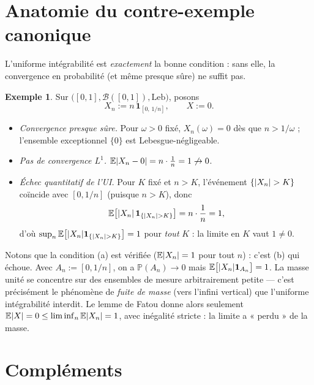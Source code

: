 \documentclass[11pt,a4paper]{article}
\theoremstyle{definition}
\newtheorem{example}[theorem]{Exemple}
\theoremstyle{remark}
\newcommand{\E}{\mathbb{E}}
\newcommand{\PP}{\mathbb{P}}
\newcommand{\ind}[1]{\mathbf{1}_{#1}}
\DeclarePairedDelimiter{\abs}{\lvert}{\rvert}
\begin{document}
\section{Anatomie du contre-exemple canonique}\label{sec:contre-exemple}

L'uniforme intégrabilité est \emph{exactement} la bonne condition : sans elle,
la convergence en probabilité (et même presque sûre) ne suffit pas.

\begin{example}
Sur $\big([0,1], \mathcal{B}([0,1]), \mathrm{Leb}\big)$, posons
\[
X_n := n\,\ind{[0,\, 1/n]}, \qquad X := 0.
\]

\begin{itemize}
\item \emph{Convergence presque sûre.} Pour $\omega > 0$ fixé,
$X_n(\omega) = 0$ dès que $n > 1/\omega$ ; l'ensemble exceptionnel $\{0\}$ est
Lebesgue-négligeable.
\item \emph{Pas de convergence $L^1$.}
$\E\abs{X_n - 0} = n \cdot \frac{1}{n} = 1 \not\to 0$.
\item \emph{Échec quantitatif de l'UI.} Pour $K$ fixé et $n > K$, l'événement
$\{\abs{X_n} > K\}$ coïncide avec $[0, 1/n]$ (puisque $n > K$), donc
\[
\E\big[\abs{X_n}\,\ind{\{\abs{X_n} > K\}}\big] = n \cdot \frac{1}{n} = 1,
\]
d'où $\sup_n \E\big[\abs{X_n}\ind{\{\abs{X_n}>K\}}\big] = 1$ pour \emph{tout}
$K$ : la limite en $K$ vaut $1 \ne 0$.
\end{itemize}

Notons que la condition (a) est vérifiée ($\E\abs{X_n} = 1$ pour tout $n$) :
c'est (b) qui échoue. Avec $A_n := [0, 1/n]$, on a $\PP(A_n) \to 0$ mais
$\E\big[\abs{X_n}\ind{A_n}\big] = 1$. La masse unité se concentre sur des
ensembles de mesure arbitrairement petite --- c'est précisément le phénomène de
\emph{fuite de masse} (vers l'infini vertical) que l'uniforme intégrabilité
interdit. Le lemme de Fatou donne alors seulement
$\E\abs{X} = 0 \le \liminf_n \E\abs{X_n} = 1$, avec inégalité stricte : la
limite a « perdu » de la masse.
\end{example}

\section{Compléments}
\end{document}
